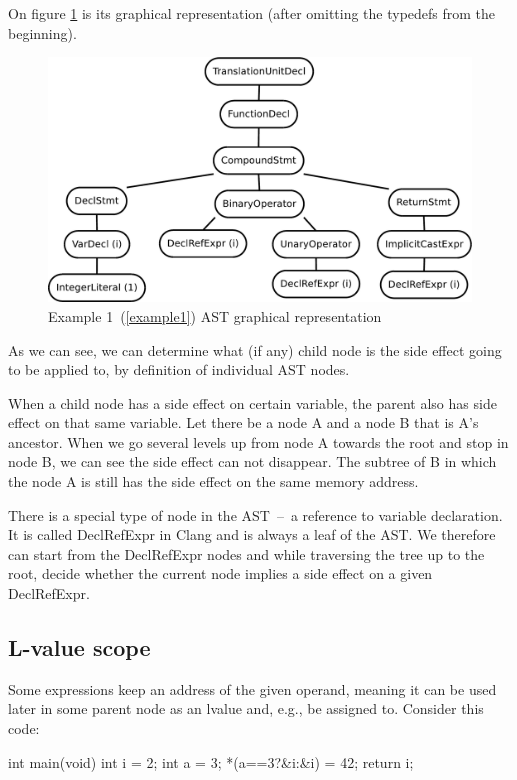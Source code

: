On figure \ref{ASTuntagged} is its graphical representation (after omitting the typedefs from the beginning).
\begin{figure}
    \caption{Example 1~(\ref{example1}) AST graphical representation}
    \label{ASTuntagged}
    \centering
        \includegraphics[width=1\textwidth]{fig/example1G.pdf}
\end{figure}

As we can see, we can determine what (if any) child node is the side effect going to be applied to, by definition of individual AST nodes. 

When a child node has a side effect on certain variable, the parent also has side effect on that same variable. Let there be a node A and a node B that is A's ancestor. When we go several levels up from node A towards the root and stop in node B, we can see the side effect can not disappear. The subtree of B in which the node A is still has the side effect on the same memory address.

There is a special type of node in the AST~--~a reference to variable declaration. It is called DeclRefExpr in Clang and is always a leaf of the AST. We therefore can start from the DeclRefExpr nodes and while traversing the tree up to the root, decide whether the current node implies a side effect on a given DeclRefExpr.

\subsection{L-value scope}
Some expressions keep an address of the given operand, meaning it can be used later in some parent node as an lvalue and, e.g., be assigned to. Consider this code:
\\\begin{code}
int main(void){
    int i = 2;
    int a = 3;
    *(a==3?&i:&i) = 42;
    return i;
}

\end{code}

